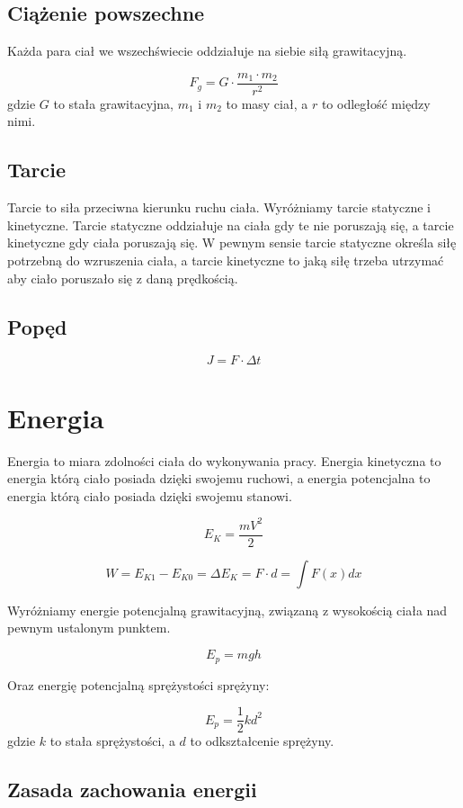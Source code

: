 \documentclass{../notatki}
\begin{document}
\subsection{Ciążenie powszechne}

Każda para ciał we wszechświecie oddziałuje na siebie siłą grawitacyjną.

$$
F_g = G \cdot \frac{m_1 \cdot m_2}{r^2}
$$
gdzie $G$ to stała grawitacyjna, $m_1$ i $m_2$ to masy ciał, a $r$ to odległość
między nimi.

\subsection{Tarcie}

Tarcie to siła przeciwna kierunku ruchu ciała. Wyróżniamy tarcie statyczne i
kinetyczne. Tarcie statyczne oddziałuje na ciała gdy te nie poruszają się, a
tarcie kinetyczne gdy ciała poruszają się. W pewnym sensie tarcie statyczne
określa siłę potrzebną do wzruszenia ciała, a tarcie kinetyczne to jaką siłę
trzeba utrzymać aby ciało poruszało się z daną prędkością.

\subsection{Popęd}

$$
J = F \cdot \Delta t
$$

\section{Energia}

Energia to miara zdolności ciała do wykonywania pracy. Energia kinetyczna to
energia którą ciało posiada dzięki swojemu ruchowi, a energia potencjalna to
energia którą ciało posiada dzięki swojemu stanowi.

$$
E_K = \frac{mV^2}{2}
$$

$$
W = E_{K1} - E_{K0} = \Delta E_K = F \cdot d = \int F(x) dx
$$

Wyróżniamy energie potencjalną grawitacyjną, związaną z wysokością ciała nad
pewnym ustalonym punktem.

$$
E_p = mgh
$$

Oraz energię potencjalną sprężystości sprężyny:

$$
E_p = \frac{1}{2}kd^2
$$
gdzie $k$ to stała sprężystości, a $d$ to odkształcenie sprężyny.

\subsection{Zasada zachowania energii}
\end{document}
